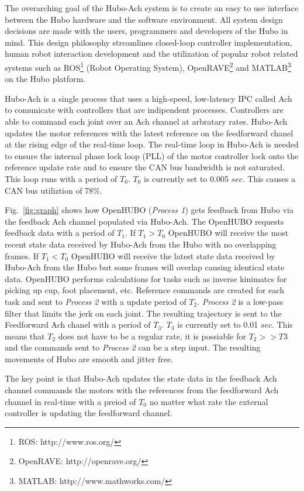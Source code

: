The overarching goal of the Hubo-Ach system is to create an easy to use interface between the Hubo hardware and the software environment.  
All system design decisions are made with the users, programmers and developers of the Hubo in mind.
This design philosophy streamlines closed-loop controller implementation, human robot interaction development and the utilization of popular robot related systems such as ROS\footnote{ROS: http://www.ros.org/} (Robot Operating System), OpenRAVE\footnote{OpenRAVE: http://openrave.org/} and MATLAB\footnote{MATLAB: http://www.mathworks.com/} on the Hubo platform.

Hubo-Ach is a single process that uses a high-speed, low-latency IPC called Ach \cite{ach} to comunicate with controllers that are indipendent processes.
Controllers are able to command each joint over an Ach channel at arbratary rates.
Hubo-Ach updates the motor references with the latest reference on the feedforward chanel at the rising edge of the real-time loop.
The real-time loop in Hubo-Ach is needed to ensure the internal phase lock loop (PLL) of the motor controller lock onto the reference update rate and to ensure the CAN bus bandwidth is not saturated.
This loop runs with a period of $T_0$.
$T_0$ is currently set to 0.005 $sec$.
This causes a CAN bus utiliztion of 78\%.

Fig.~\ref{fig:graph} shows how OpenHUBO (\textit{Process 1}) gets feedback from Hubo via the feedback Ach channel populated via Hubo-Ach.  
The OpenHUBO requests feedback data with a period of $T_1$.
If $T_1>T_0$ OpenHUBO will receive the most recent state data received by Hubo-Ach from the Hubo with no overlapping frames.
If $T_1<T_0$ OpenHUBO will receive the latest state data received by Hubo-Ach from the Hubo but some frames will overlap causing identical state data.
OpenHUBO performs calculations for tasks such as inverse kinimatcs for picking up cup, foot placement, etc.
Reference commands are created for each task and sent to \textit{Process 2} with a update period of $T_2$.
\textit{Process 2} is a low-pass filter that limits the jerk on each joint.
The resulting trajectory is sent to the Feedforward Ach chanel with a period of $T_3$.
$T_3$ is currently set to 0.01 $sec$.
This means that $T_2$ does not have to be a regular rate, it is possiable for $T_2>>T3$ and the commands sent to \textit{Process 2} can be a step input.
The resulting movements of Hubo are smooth and jitter free.





The key point is that Hubo-Ach updates the state data in the feedback Ach channel commands the motors with the references from the feedforward Ach channel in real-time with a preiod of $T_0$ no matter what rate the external controller is updating the feedforward channel.  










